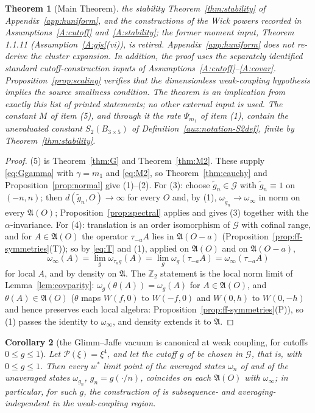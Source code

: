 \documentclass[11pt,a4paper]{article}
\theoremstyle{plain}
\newtheorem{theorem}{Theorem}[section]
\newtheorem{corollary}[theorem]{Corollary}
\theoremstyle{definition}
\theoremstyle{plain}
\theoremstyle{definition}
\newcommand{\Z}{\mathbb{Z}}
\newcommand{\A}{\mathfrak{A}}
\newcommand{\G}{\mathcal{G}}
\begin{document}
\begin{theorem}[Main Theorem]
the stability Theorem~\ref{thm:stability} of Appendix~\ref{app:huniform}, and the
constructions of the Wick powers recorded in Assumptions~\ref{A:cutoff}
and~\ref{A:stability}; the former moment input, Theorem 1.1.11 (Assumption~\ref{A:gjs}(vi)),
is retired.  Appendix~\ref{app:huniform} does not re-derive the cluster expansion.  In
addition, the proof uses the separately identified standard cutoff-construction inputs of
Assumptions~\ref{A:cutoff}--\ref{A:covar}.  Proposition~\ref{prop:scaling} verifies that the
dimensionless weak-coupling hypothesis implies the source smallness condition. The theorem
is an implication from exactly this list of printed statements; no other external input is
used.  The constant $M$ of item (5), and through it the rate $\Psi_{m_1}$ of item (1),
contain the unevaluated constant $S_2(B_{3\times5})$ of Definition~\ref{aux:notation-S2def},
finite by Theorem~\ref{thm:stability}.
\end{theorem}

\begin{proof}
(5) is Theorem~\ref{thm:G} and Theorem~\ref{thm:M2}. These supply \eqref{eq:Ggamma} with
$\gamma=m_1$ and \eqref{eq:M2}, so Theorem~\ref{thm:cauchy} and
Proposition~\ref{prop:normal} give (1)--(2). For (3): choose $\widetilde g_n\in\G$ with
$\widetilde g_n\equiv1$ on $(-n,n)$; then $d(\widetilde g_n,O)\to\infty$ for every $O$
and, by (1), $\omega_{\widetilde g_n}\to\omega_\infty$ in norm on every $\A(O)$;
Proposition~\ref{prop:spectral} applies and gives (3) together with the
$\alpha$-invariance. For (4): translation is an order isomorphism of $\G$ with cofinal
range, and for $A\in\A(O)$ the operator $\tau_{-a}A$ lies in $\A(O-a)$
(Proposition~\ref{prop:ff-symmetries}(T)); so by \eqref{eq:T} and (1), applied on $\A(O)$ and
on $\A(O-a)$,
\[
 \omega_\infty(A)=\lim_g\omega_{\tau_ag}(A)
 =\lim_g\omega_g(\tau_{-a}A)
 =\omega_\infty(\tau_{-a}A)
\]
for local $A$, and by density on $\A$. The $\Z_2$ statement is the local norm limit of
Lemma~\ref{lem:covparity}: $\omega_g(\theta(A))=\omega_g(A)$ for $A\in\A(O)$, and
$\theta(A)\in\A(O)$ ($\theta$ maps $W(f,0)$ to $W(-f,0)$ and $W(0,h)$ to $W(0,-h)$ and hence
preserves each local algebra: Proposition~\ref{prop:ff-symmetries}(P)), so (1) passes the
identity to $\omega_\infty$, and density extends it to $\A$.
\end{proof}

\begin{corollary}[the Glimm--Jaffe vacuum is canonical at weak coupling, for cutoffs
$0\le g\le1$]\label{cor:canonical}
Let $\mathscr P(\xi)=\xi^4$, and let the cutoff $g$ of \cite[(2.3)]{GJ3} be chosen in $\G$, that
is, with $0\le g\le1$.  Then every $w^*$ limit point of the averaged states $\omega_n$ of
\cite[(2.4)]{GJ3} and of the unaveraged states $\omega_{g_n}$, $g_n=g(\cdot/n)$, coincides on
each $\A(O)$ with $\omega_\infty$; in particular, for such $g$, the construction of
\cite[\S2]{GJ3} is subsequence- and averaging-independent in the weak-coupling region.
\end{corollary}
\end{document}
